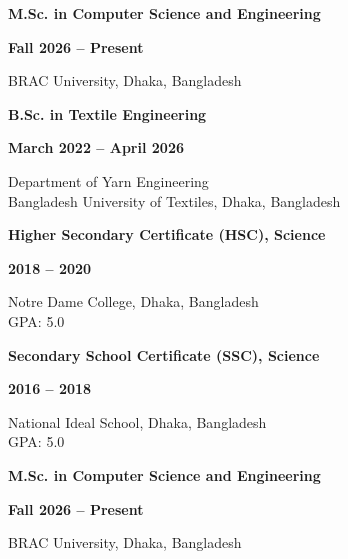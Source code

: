 \ifsqa
\noindent
\begin{minipage}[t]{0.70\textwidth}
    \raggedright
    {\fontsize{12pt}{15pt}\bfseries M.Sc. in Computer Science and Engineering}
\end{minipage}%
\hfill
\begin{minipage}[t]{0.30\textwidth}
    \raggedleft
    {\fontsize{12pt}{15pt}\bfseries Fall 2026 -- Present}
\end{minipage}
BRAC University, Dhaka, Bangladesh\\
\vspace{0.3em}

\noindent
\begin{minipage}[t]{0.50\textwidth}
    \raggedright
    {\fontsize{12pt}{15pt}\bfseries B.Sc. in Textile Engineering}
\end{minipage}%
\hfill
\begin{minipage}[t]{0.50\textwidth}
    \raggedleft
    {\fontsize{12pt}{15pt}\bfseries March 2022 -- April 2026}
\end{minipage}
Department of Yarn Engineering\\
Bangladesh University of Textiles, Dhaka, Bangladesh\\
\vspace{0.3em}

\noindent
\begin{minipage}[t]{0.50\textwidth}
    \raggedright
    {\fontsize{12pt}{15pt}\bfseries Higher Secondary Certificate (HSC), Science}
\end{minipage}%
\hfill
\begin{minipage}[t]{0.50\textwidth}
    \raggedleft
    {\fontsize{12pt}{15pt}\bfseries 2018 -- 2020}
\end{minipage}
Notre Dame College, Dhaka, Bangladesh\\
GPA: 5.0\\
\vspace{0.3em}

\noindent
\begin{minipage}[t]{0.50\textwidth}
    \raggedright
    {\fontsize{12pt}{15pt}\bfseries Secondary School Certificate (SSC), Science}
\end{minipage}%
\hfill
\begin{minipage}[t]{0.50\textwidth}
    \raggedleft
    {\fontsize{12pt}{15pt}\bfseries 2016 -- 2018}
\end{minipage}
National Ideal School, Dhaka, Bangladesh\\
GPA: 5.0\\
\vspace{0.3em}
\else
\noindent
\begin{minipage}[t]{0.70\textwidth}
    \raggedright
    {\fontsize{12pt}{15pt}\bfseries M.Sc. in Computer Science and Engineering}
\end{minipage}%
\hfill
\begin{minipage}[t]{0.30\textwidth}
    \raggedleft
    {\fontsize{12pt}{15pt}\bfseries Fall 2026 -- Present}
\end{minipage}
BRAC University, Dhaka, Bangladesh\\
\vspace{0.3em}

